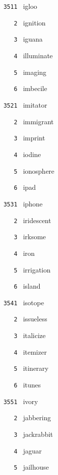 \documentclass[11pt]{article}
\begin{document}
\begin{multicols}{6}
\noindent \texttt{ 3511 } igloo  \par
\noindent \texttt{ \ \ \ 2 } ignition  \par
\noindent \texttt{ \ \ \ 3 } iguana  \par
\noindent \texttt{ \ \ \ 4 } illuminate  \par
\noindent \texttt{ \ \ \ 5 } imaging  \par
\noindent \texttt{ \ \ \ 6 } imbecile  \par
\vspace{3mm}
\noindent \texttt{ 3521 } imitator  \par
\noindent \texttt{ \ \ \ 2 } immigrant  \par
\noindent \texttt{ \ \ \ 3 } imprint  \par
\noindent \texttt{ \ \ \ 4 } iodine  \par
\noindent \texttt{ \ \ \ 5 } ionosphere  \par
\noindent \texttt{ \ \ \ 6 } ipad  \par
\vspace{3mm}
\noindent \texttt{ 3531 } iphone  \par
\noindent \texttt{ \ \ \ 2 } iridescent  \par
\noindent \texttt{ \ \ \ 3 } irksome  \par
\noindent \texttt{ \ \ \ 4 } iron  \par
\noindent \texttt{ \ \ \ 5 } irrigation  \par
\noindent \texttt{ \ \ \ 6 } island  \par
\vspace{3mm}
\noindent \texttt{ 3541 } isotope  \par
\noindent \texttt{ \ \ \ 2 } issueless  \par
\noindent \texttt{ \ \ \ 3 } italicize  \par
\noindent \texttt{ \ \ \ 4 } itemizer  \par
\noindent \texttt{ \ \ \ 5 } itinerary  \par
\noindent \texttt{ \ \ \ 6 } itunes  \par
\vspace{3mm}
\noindent \texttt{ 3551 } ivory  \par
\noindent \texttt{ \ \ \ 2 } jabbering  \par
\noindent \texttt{ \ \ \ 3 } jackrabbit  \par
\noindent \texttt{ \ \ \ 4 } jaguar  \par
\noindent \texttt{ \ \ \ 5 } jailhouse  \par

\end{multicols}
\end{document}
